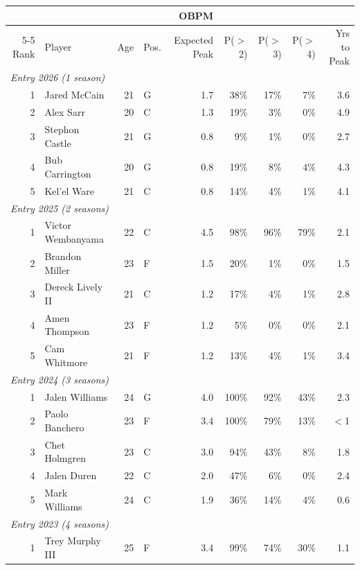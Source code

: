 \begin{table}[htbp]
  \centering\small
  \begin{tabular}{rlrlrrrrr}
    \toprule
     & & & & OBPM & & & & \\
    \cmidrule(lr){5-5}
    Rank & Player & Age & Pos. & Expected Peak & P($>$2) & P($>$3) & P($>$4) & Yrs to Peak \\
    \midrule
    \multicolumn{9}{l}{\textit{Entry 2026 (1 season)}} \\
    \midrule
    1 & Jared McCain & 21 & G & 1.7 & 38\% & 17\% & 7\% & 3.6 \\
    2 & Alex Sarr & 20 & C & 1.3 & 19\% & 3\% & 0\% & 4.9 \\
    3 & Stephon Castle & 21 & G & 0.8 & 9\% & 1\% & 0\% & 2.7 \\
    4 & Bub Carrington & 20 & G & 0.8 & 19\% & 8\% & 4\% & 4.3 \\
    5 & Kel'el Ware & 21 & C & 0.8 & 14\% & 4\% & 1\% & 4.1 \\
    \midrule[0.4pt]
    \multicolumn{9}{l}{\textit{Entry 2025 (2 seasons)}} \\
    \midrule
    1 & Victor Wembanyama & 22 & C & 4.5 & 98\% & 96\% & 79\% & 2.1 \\
    2 & Brandon Miller & 23 & F & 1.5 & 20\% & 1\% & 0\% & 1.5 \\
    3 & Dereck Lively II & 21 & C & 1.2 & 17\% & 4\% & 1\% & 2.8 \\
    4 & Amen Thompson & 23 & F & 1.2 & 5\% & 0\% & 0\% & 2.1 \\
    5 & Cam Whitmore & 21 & F & 1.2 & 13\% & 4\% & 1\% & 3.4 \\
    \midrule[0.4pt]
    \multicolumn{9}{l}{\textit{Entry 2024 (3 seasons)}} \\
    \midrule
    1 & Jalen Williams & 24 & G & 4.0 & 100\% & 92\% & 43\% & 2.3 \\
    2 & Paolo Banchero & 23 & F & 3.4 & 100\% & 79\% & 13\% & $<$1 \\
    3 & Chet Holmgren & 23 & C & 3.0 & 94\% & 43\% & 8\% & 1.8 \\
    4 & Jalen Duren & 22 & C & 2.0 & 47\% & 6\% & 0\% & 2.4 \\
    5 & Mark Williams & 24 & C & 1.9 & 36\% & 14\% & 4\% & 0.6 \\
    \midrule[0.4pt]
    \multicolumn{9}{l}{\textit{Entry 2023 (4 seasons)}} \\
    \midrule
    1 & Trey Murphy III & 25 & F & 3.4 & 99\% & 74\% & 30\% & 1.1 \\

\end{tabular}
\end{table}
